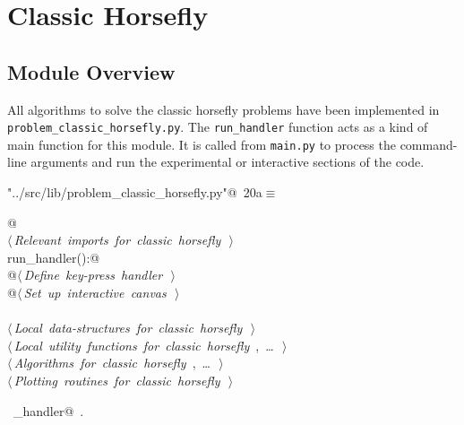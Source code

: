 \documentclass[11.5pt]{report}
\begin{document}
\chapter{Classic Horsefly}
\label{chap:classic-horsefly}

\section{Module Overview}

\newchunk 
All algorithms to solve the classic horsefly problems have been implemented in 
\verb|problem_classic_horsefly.py|. The \verb|run_handler| function acts 
as a kind of main function for this module. It is called from 
\verb|main.py| to process the command-line arguments and run the 
experimental or interactive sections of the code. 

\begin{flushleft} \small\label{scrap11}\raggedright\small
{} \verb@"../src/lib/problem_classic_horsefly.py"@\nobreak\ {\footnotesize {20a}}$\equiv$
\vspace{-1ex}
\begin{list}{}{} \item
\mbox{}\verb@    @\\
\mbox{}\verb@@\hbox{$\langle\,${\itshape Relevant imports for classic horsefly}\nobreak\ {\footnotesize {}}$\,\rangle$}\verb@@\\
\mbox{}\verb@def run_handler():@\\
\mbox{}\verb@    @\hbox{$\langle\,${\itshape Define key-press handler}\nobreak\ {\footnotesize {}}$\,\rangle$}\verb@@\\
\mbox{}\verb@    @\hbox{$\langle\,${\itshape Set up interactive canvas}\nobreak\ {\footnotesize {}}$\,\rangle$}\verb@@\\
\mbox{}\verb@@\\
\mbox{}\verb@@\hbox{$\langle\,${\itshape Local data-structures for classic horsefly}\nobreak\ {\footnotesize {}}$\,\rangle$}\verb@@\\
\mbox{}\verb@@\hbox{$\langle\,${\itshape Local utility functions for classic horsefly}\nobreak\ {\footnotesize {}, \ldots\ }$\,\rangle$}\verb@@\\
\mbox{}\verb@@\hbox{$\langle\,${\itshape Algorithms for classic horsefly}\nobreak\ {\footnotesize {}, \ldots\ }$\,\rangle$}\verb@@\\
\mbox{}\verb@@\hbox{$\langle\,${\itshape Plotting routines for classic horsefly}\nobreak\ {\footnotesize {}}$\,\rangle$}\verb@@\\
\mbox{}\verb@@{\NWsep}
\end{list}
\vspace{-1.5ex}
\footnotesize
\begin{list}{}{\setlength{\itemsep}{-\parsep}\setlength{\itemindent}{-\leftmargin}}
\item \NWtxtIdentsDefed\nobreak\  \verb@run_handler@\nobreak\ \NWtxtIdentsNotUsed.
\item{}
\end{list}
\vspace{4ex}
\end{flushleft}
\end{document}

